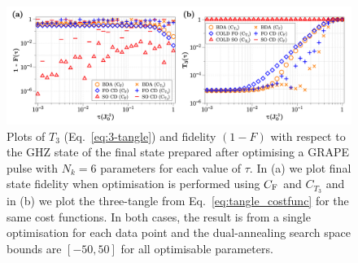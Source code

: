 \documentclass[a4paper,oneside,11pt]{book}
\begin{document}
\begin{figure}[t]
    \centering
    \includegraphics[width=\linewidth]{images/tangle_plots.png} \caption[Preparing 3-spin GHZ states using the 3-tangle as a metric.]{Plots of $T_3$ (Eq.~\eqref{eq:3-tangle}) and fidelity $(1 - F)$ with respect to the GHZ state of the final state prepared after optimising a GRAPE pulse with $N_k = 6$ parameters for each value of $\tau$. In (a) we plot final state fidelity when optimisation is performed using $C_{\rm F}$ and $C_{T_3}$ and in (b) we plot the three-tangle from Eq.~\eqref{eq:tangle_costfunc} for the same cost functions. In both cases, the result is from a single optimisation for each data point and the dual-annealing search space bounds are $[-50,50]$ for all optimisable parameters.}\label{fig:tangle_v_fidelity}
\end{figure}
\end{document}
